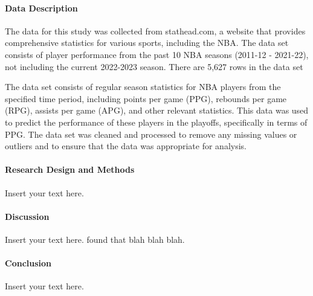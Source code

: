 \documentclass[12pt]{article}
\begin{document}
\paragraph{Data Description}
The data for this study was collected from stathead.com, a website that provides comprehensive statistics for various sports, including the NBA. The data set consists of player performance from the past 10 NBA seasons (2011-12 - 2021-22), not including the current 2022-2023 season. There are 5,627 rows in the data set 

The data set consists of regular season statistics for NBA players from the specified time period, including points per game (PPG), rebounds per game (RPG), assists per game (APG), and other relevant statistics. This data was used to predict the performance of these players in the playoffs, specifically in terms of PPG. The data set was cleaned and processed to remove any missing values or outliers and to ensure that the data was appropriate for analysis.


\paragraph{Research Design and Methods}
Insert your text here.

\paragraph{Discussion}
Insert your text here. \citet{wild2004global} found that blah blah blah.

\paragraph{Conclusion}
Insert your text here.




\typeout{}
\end{document}
